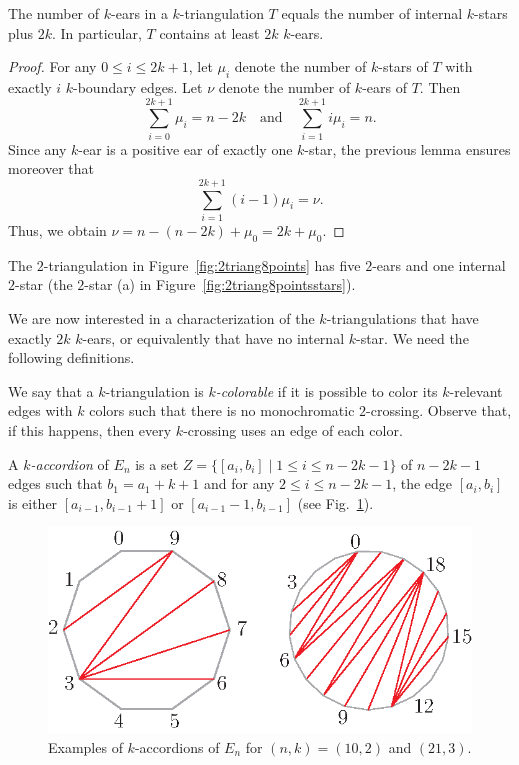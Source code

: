 \documentclass[12pt]{amsart}
\begin{document}
\begin{corollary}\label{earsenumeration}
The number of $k$-ears in a $k$-triangulation $T$ equals the number of internal $k$-stars plus $2k$.
In particular, $T$ contains at least $2k$ $k$-ears.
\end{corollary}

\begin{proof}
For any $0\le i\le 2k+1$, let $\mu_i$ denote the number of $k$-stars of $T$ with exactly $i$ $k$-boundary edges. Let $\nu$ denote the number of $k$-ears of $T$. Then
$$\sum_{i=0}^{2k+1} \mu_i=n-2k \quad \mathrm{and}\quad \sum_{i=1}^{2k+1} i\mu_i=n.$$
Since any $k$-ear is a positive ear of exactly one $k$-star, the previous lemma ensures moreover that
$$\sum_{i=1}^{2k+1} (i-1)\mu_i=\nu.$$
Thus, we obtain $\nu=n-(n-2k)+\mu_0=2k+\mu_0$.
\end{proof}

\begin{example}
\rm
The $2$-triangulation in Figure~\ref{fig:2triang8points} has five $2$-ears and one internal $2$-star (the $2$-star (a) in Figure~\ref{fig:2triang8pointsstars}).
\end{example}

We are now interested in a characterization of the $k$-triangulations that have exactly $2k$ $k$-ears, or equivalently that have no internal $k$-star. We need the following definitions.

We say that a $k$-triangulation is \emph{$k$-colorable} if it is possible to color its $k$-relevant edges with $k$ colors such that there is no monochromatic $2$-crossing. Observe that, if this happens, then every $k$-crossing uses an edge of each color.

\begin{definition}
A \emph{$k$-accordion} of $E_n$ is a set $Z=\{[a_i,b_i]\;|\; 1\le i\le n-2k-1\}$ of $n-2k-1$ edges such that $b_1=a_1+k+1$ and for any $2\le i\le n-2k-1$, the edge $[a_i,b_i]$ is either $[a_{i-1},b_{i-1}+1]$ or $[a_{i-1}-1,b_{i-1}]$ (see Fig.~\ref{accordion}).
\end{definition}

\begin{figure}
\centerline{\includegraphics[scale=1]{accordion.eps}}
\caption{\small{Examples of $k$-accordions of $E_n$ for $(n,k)=(10,2)$ and $(21,3)$.}}\label{accordion}
\end{figure}
\end{document}
